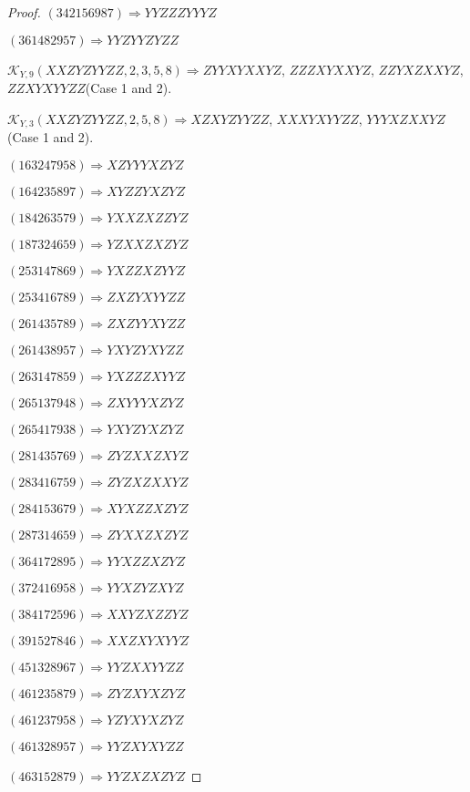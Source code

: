 \documentclass[12pt]{article}
\theoremstyle{plain}
\theoremstyle{definition}
\theoremstyle{remark}
\newcommand{\fancy}[1]{\mathcal{#1}}
\def\K{\fancy{K}}
\begin{document}
\begin{proof}
	$(3 4 2 1 5 6 9 8 7)\Rightarrow YYZZZYYYZ$
	
	$(3 6 1 4 8 2 9 5 7)\Rightarrow YYZYYZYZZ$
	
	
	
	$\K_{Y,9}(XXZYZYYZZ,2, 3, 5, 8)\Rightarrow $$ZYYXYXXYZ$, $ZZZXYXXYZ$, $ZZYXZXXYZ$, $ZZXYXYYZZ$(Case 1 and 2).
	
	$\K_{Y,3}(XXZYZYYZZ,2, 5, 8)\Rightarrow $$XZXYZYYZZ$, $XXXYXYYZZ$, $YYYXZXXYZ$(Case 1 and 2).
	
	
	
	$(1 6 3 2 4 7 9 5 8)\Rightarrow XZYYYXZYZ$
	
	$(1 6 4 2 3 5 8 9 7)\Rightarrow XYZZYXZYZ$
	
	$(1 8 4 2 6 3 5 7 9)\Rightarrow YXXZXZZYZ$
	
	$(1 8 7 3 2 4 6 5 9)\Rightarrow YZXXZXZYZ$
	
	$(2 5 3 1 4 7 8 6 9)\Rightarrow YXZZXZYYZ$
	
	$(2 5 3 4 1 6 7 8 9)\Rightarrow ZXZYXYYZZ$
	
	$(2 6 1 4 3 5 7 8 9)\Rightarrow ZXZYYXYZZ$
	
	$(2 6 1 4 3 8 9 5 7)\Rightarrow YXYZYXYZZ$
	
	$(2 6 3 1 4 7 8 5 9)\Rightarrow YXZZZXYYZ$
	
	$(2 6 5 1 3 7 9 4 8)\Rightarrow ZXYYYXZYZ$
	
	$(2 6 5 4 1 7 9 3 8)\Rightarrow YXYZYXZYZ$
	
	$(2 8 1 4 3 5 7 6 9)\Rightarrow ZYZXXZXYZ$
	
	$(2 8 3 4 1 6 7 5 9)\Rightarrow ZYZXZXXYZ$
	
	$(2 8 4 1 5 3 6 7 9)\Rightarrow XYXZZXZYZ$
	
	$(2 8 7 3 1 4 6 5 9)\Rightarrow ZYXXZXZYZ$
	
	$(3 6 4 1 7 2 8 9 5)\Rightarrow YYXZZXZYZ$
	
	$(3 7 2 4 1 6 9 5 8)\Rightarrow YYXZYZXYZ$
	
	$(3 8 4 1 7 2 5 9 6)\Rightarrow XXYZXZZYZ$
	
	$(3 9 1 5 2 7 8 4 6)\Rightarrow XXZXYXYYZ$
	
	$(4 5 1 3 2 8 9 6 7)\Rightarrow YYZXXYYZZ$
	
	$(4 6 1 2 3 5 8 7 9)\Rightarrow ZYZXYXZYZ$
	
	$(4 6 1 2 3 7 9 5 8)\Rightarrow YZYXYXZYZ$
	
	$(4 6 1 3 2 8 9 5 7)\Rightarrow YYZXYXYZZ$
	
	$(4 6 3 1 5 2 8 7 9)\Rightarrow YYZXZXZYZ$
	

\end{proof}
\end{document}
